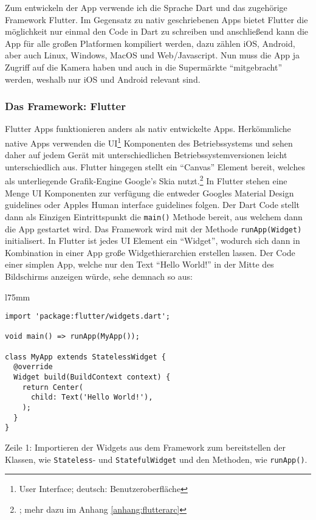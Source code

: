 Zum entwickeln der App verwende ich die Sprache Dart und das zugehörige Framework Flutter. Im Gegensatz zu nativ geschriebenen Apps bietet Flutter die möglichkeit nur einmal den Code in Dart zu schreiben und anschließend kann die App für alle großen Platformen kompiliert werden, dazu zählen iOS, Android, aber auch Linux, Windows, MacOS und Web/Javascript. Nun muss die App ja Zugriff auf die Kamera haben und auch in die Supermärkte "`mitgebracht"' werden, weshalb nur iOS und Android relevant sind.

\subsubsection{Das Framework: Flutter}

Flutter Apps funktionieren anders als nativ entwickelte Apps. Herkömmliche native Apps verwenden die UI\footnote{User Interface; deutsch: Benutzeroberfläche} Komponenten des Betriebssystems und sehen daher auf jedem Gerät mit unterschiedlichen Betriebssystemversionen leicht unterschiedlich aus. Flutter hingegen stellt ein "`Canvas"' Element bereit, welches als unterliegende Grafik-Engine Google's Skia nutzt.\footnote{\cite{flutterarchitecture}; mehr dazu im Anhang \ref{anhang:flutterarc}} In Flutter stehen eine Menge UI Komponenten zur verfügung die entweder Googles Material Design guidelines oder Apples Human interface guidelines folgen. Der Dart Code stellt dann als Einzigen Eintrittspunkt die \texttt{main()} Methode bereit, aus welchem dann die App gestartet wird. Das Framework wird mit der Methode \texttt{runApp(Widget)} initialisert. In Flutter ist jedes UI Element ein "`Widget"', wodurch sich dann in Kombination in einer App große Widgethierarchien erstellen lassen. Der Code einer simplen App, welche nur den Text "`Hello World!"' in der Mitte des Bildschirms anzeigen würde, sehe demnach so aus:

\begin{wrapfigure}{l}{75mm} 
    \begin{verbatim}
import 'package:flutter/widgets.dart';

void main() => runApp(MyApp());

class MyApp extends StatelessWidget {
  @override
  Widget build(BuildContext context) {
    return Center(
      child: Text('Hello World!'),
    );
  }
}
\end{verbatim}
\end{wrapfigure}

Zeile 1: Importieren der Widgets aus dem Framework zum bereitstellen der Klassen, wie \texttt{Stateless}- und \texttt{StatefulWidget} und den Methoden, wie \texttt{runApp()}.

